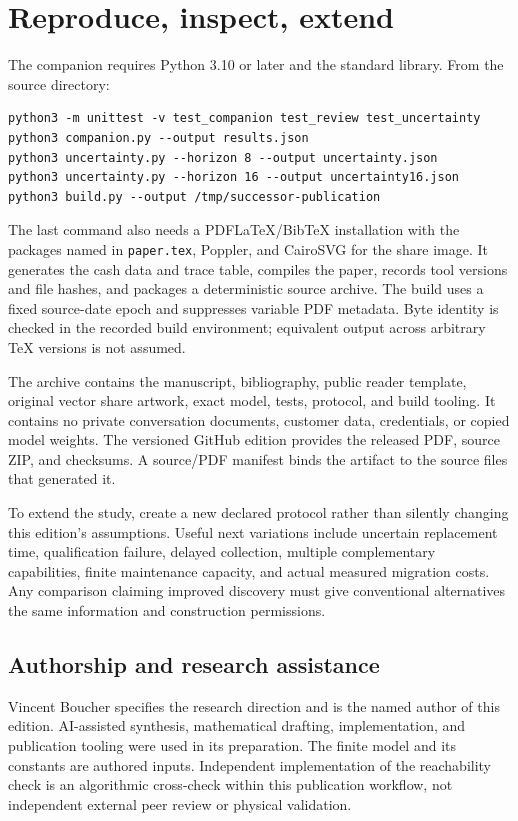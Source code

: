 \section{Reproduce, inspect, extend}
\label{app:reproduce}
The companion requires Python 3.10 or later and the standard library. From the source directory:
\begin{verbatim}
python3 -m unittest -v test_companion test_review test_uncertainty
python3 companion.py --output results.json
python3 uncertainty.py --horizon 8 --output uncertainty.json
python3 uncertainty.py --horizon 16 --output uncertainty16.json
python3 build.py --output /tmp/successor-publication
\end{verbatim}
The last command also needs a PDFLaTeX/BibTeX installation with the packages named in \texttt{paper.tex}, Poppler, and CairoSVG for the share image. It generates the cash data and trace table, compiles the paper, records tool versions and file hashes, and packages a deterministic source archive. The build uses a fixed source-date epoch and suppresses variable PDF metadata. Byte identity is checked in the recorded build environment; equivalent output across arbitrary TeX versions is not assumed.

The archive contains the manuscript, bibliography, public reader template, original vector share artwork, exact model, tests, protocol, and build tooling. It contains no private conversation documents, customer data, credentials, or copied model weights. The versioned GitHub edition provides the released PDF, source ZIP, and checksums. A source/PDF manifest binds the artifact to the source files that generated it.

To extend the study, create a new declared protocol rather than silently changing this edition's assumptions. Useful next variations include uncertain replacement time, qualification failure, delayed collection, multiple complementary capabilities, finite maintenance capacity, and actual measured migration costs. Any comparison claiming improved discovery must give conventional alternatives the same information and construction permissions.

\subsection*{Authorship and research assistance}
Vincent Boucher specifies the research direction and is the named author of this edition. AI-assisted synthesis, mathematical drafting, implementation, and publication tooling were used in its preparation. The finite model and its constants are authored inputs. Independent implementation of the reachability check is an algorithmic cross-check within this publication workflow, not independent external peer review or physical validation.
